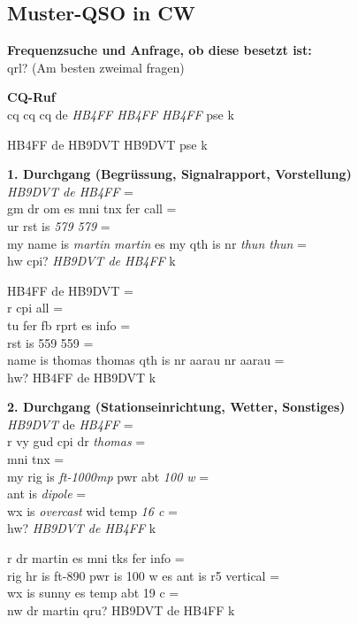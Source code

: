 {
\newcommand{\B}[1]{ \hspace*{.4\textwidth }\begin{minipage}{.55\textwidth }#1\end{minipage} }
\newcommand{\T}[1]{\vspace*{1em}

\noindent
\textbf{#1}\\}
\newcommand{\EN}[1]{\textit{#1}}
\newcommand{\gap}[1]{\textcolor{cgap}{\textit{#1}}}

\newpage
\subsection{Muster-QSO in CW}\label{sec:cwqso}

\textbf{Frequenzsuche und Anfrage, ob diese besetzt ist:}\\
qrl?  (Am besten zweimal fragen)

\T{CQ-Ruf}
cq cq cq de \gap{HB4FF HB4FF HB4FF} pse k\\
\B{HB4FF de HB9DVT HB9DVT  pse k}

\T{1. Durchgang (Begrüssung, Signalrapport, Vorstellung)}
\gap{HB9DVT de HB4FF} =\\
gm dr om es mni tnx fer call =\\
ur rst is \gap{579 579} = \\
my name is \gap{martin martin} es my qth is nr \gap{thun thun} =\\
hw cpi? \gap{HB9DVT de HB4FF} k\\
\B{
HB4FF de HB9DVT =\\
r cpi all =\\
tu fer fb rprt es info =\\
rst is 559 559 =\\
name is thomas thomas qth is nr aarau nr aarau =\\
hw? HB4FF de HB9DVT k
}

\T{2. Durchgang (Stationseinrichtung, Wetter, Sonstiges)}
\gap{HB9DVT} de \gap{HB4FF} =\\
r vy gud cpi dr \gap{thomas} =\\
mni tnx =\\
my rig is \gap{ft-1000mp} pwr abt \gap{100 w} =\\
ant is \gap{dipole} =\\
wx is \gap{overcast} wid temp \gap{16 c} =\\
hw? \gap{HB9DVT de HB4FF} k\\
\B{
r dr martin es mni tks fer info =\\
rig hr is ft-890 pwr is 100 w es ant is r5 vertical =\\
wx is sunny es temp abt 19 c =\\
nw dr martin qru? HB9DVT de HB4FF k
}

}
